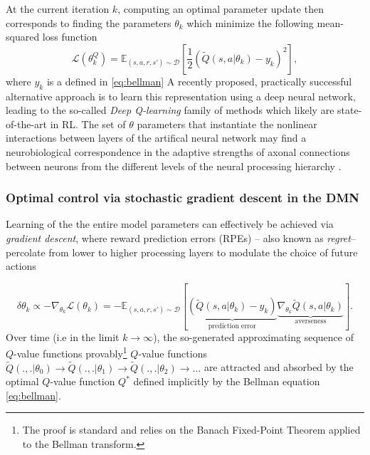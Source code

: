 \documentclass[10pt,letterpaper]{article}
\begin{document}
At the current iteration $k$, computing an optimal parameter update then corresponds to finding the parameters $\theta_{k}$ which minimize the following mean-squared loss function
\begin{equation}
  \mathcal L(\theta^Q_{k})
  = \mathbb E_{(s, a, r, s') \sim \mathcal D}\left[\frac{1}{2}(\tilde{Q}(s, a|\theta_{k}) - y_k)^2\right],
  \label{eq:oracle}
\end{equation}
where $y_k$ is a defined in \eqref{eq:bellman}
A recently proposed, practically successful alternative approach
\citep{mnih2015,silver2016mastering} is to learn this
representation using a deep neural network, leading to the so-called \textit{Deep Q-learning} family of methods which
likely are state-of-the-art in RL.
The set of $\theta$ parameters that instantiate the nonlinear interactions
between layers of the artifical neural network
may find a neurobiological correspondence in the adaptive strengths of axonal
connections between neurons from the different levels
of the neural processing hierarchy
\citep{mesulam1998sensation, taylor2015global}.


\subsubsection{Optimal control via stochastic gradient descent in the DMN}
Learning of the the entire model parameters can effectively be achieved
via \textit{gradient descent},
where reward prediction errors (RPEs) -- also known as \textit{regret}-- percolate
from lower to higher processing layers to modulate the choice of future actions


\begin{equation}
  \delta \theta_{k} \propto -\nabla_{\theta_{k}}\mathcal L(\theta_{k})
  = -\mathbb E_{(s, a, r, s') \sim \mathcal D}[\underbrace{(\tilde{Q}(s, a|\theta_{k}) - y_k)}_{\text{prediction error}}
    \underbrace{\nabla_{\theta_{k}}\tilde{Q}(s, a|\theta_{k})}_{\text{averseness}}].
  \label{eq:oracle}
\end{equation}
Over time (i.e in the limit $k \rightarrow \infty$), the so-generated approximating sequence of
$Q$-value functions provably\footnote{The proof is standard and relies on the Banach Fixed-Point Theorem applied to the Bellman transform.} $Q$-value functions $\tilde{Q}(.,.|\theta_0) \rightarrow \tilde{Q}(.,.|\theta_1) \rightarrow \tilde{Q}(.,.|\theta_2) \rightarrow \ldots$
are attracted and absorbed by the optimal $Q$-value function $Q^*$ defined implicitly by the Bellman equation \eqref{eq:bellman}.
\end{document}
